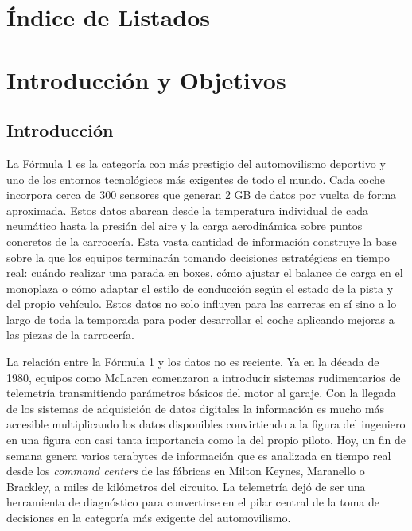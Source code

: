 \documentclass[12pt,a4paper,twoside,openright]{book}
\begin{document}
\clearpage
\tableofcontents
\clearpage
\listoffigures
\clearpage
\listoftables
\makeatletter
\cleardoublepage
{}
\chapter*{Índice de Listados}
\vspace{10pt}
\makeatother
\clearpage



\mainmatter
\chapter{Introducción y Objetivos}
\section{Introducción}
La Fórmula 1 es la categoría con más prestigio del automovilismo deportivo y uno de los entornos tecnológicos más exigentes de todo el mundo.
Cada coche incorpora cerca de 300 sensores que generan 2 GB de datos por vuelta de forma aproximada. Estos datos abarcan desde la temperatura individual de cada neumático
hasta la presión del aire y la carga aerodinámica sobre puntos concretos de la carrocería. Esta vasta cantidad de información construye la base sobre la que los equipos terminarán tomando decisiones estratégicas en tiempo real:
cuándo realizar una parada en boxes, cómo ajustar el balance de carga en el monoplaza o cómo adaptar el estilo de conducción según el estado de la pista y del propio vehículo.
Estos datos no solo influyen para las carreras en sí sino a lo largo de toda la temporada para poder desarrollar el coche aplicando mejoras a las piezas de la carrocería.

\noindent La relación entre la Fórmula 1 y los datos no es reciente. Ya en la década de 1980, equipos como McLaren comenzaron a introducir sistemas rudimentarios de telemetría transmitiendo parámetros básicos del motor al garaje. Con la llegada de los sistemas de adquisición de datos digitales la información es mucho más accesible multiplicando los datos disponibles
convirtiendo a la figura del ingeniero en una figura con casi tanta importancia como la del propio piloto. Hoy, un fin de semana genera varios terabytes de información que es analizada en tiempo real desde los \textit{command centers} de las fábricas en Milton Keynes, Maranello o Brackley, a miles de kilómetros del circuito.
La telemetría dejó de ser una herramienta de diagnóstico para convertirse en el pilar central de la toma de decisiones en la categoría más exigente del automovilismo.
\end{document}
